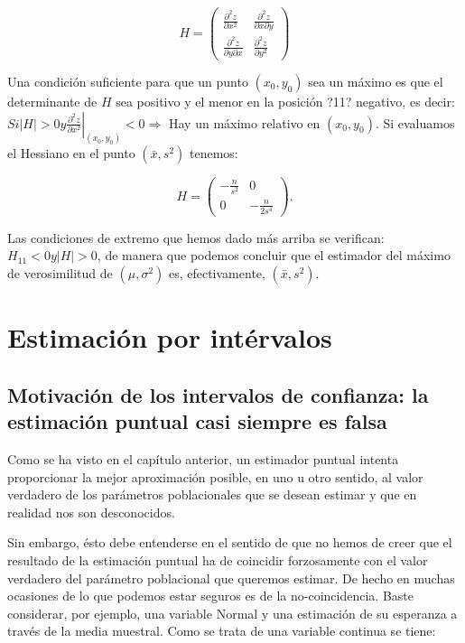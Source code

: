 \documentclass[
]{article}
\begin{document}
\[
H=\left(\begin{array}{cc}
\frac{\partial^{2} z}{\partial x^{2}} & \frac{\partial^{2} z}{\partial x \partial y} \\
\frac{\partial^{2} z}{\partial y \partial x} & \frac{\partial^{2} z}{\partial y^{2}}
\end{array}\right)
\]

Una condición suficiente para que un punto \(\left(x_{0}, y_{0}\right)\) sea un máximo es que el determinante de \(H\) sea positivo y el menor en la posición ?11? negativo, es decir:
\(S i|H|>\left.0 y \frac{\partial^{2} z}{\partial x^{2}}\right|_{\left(x_{0}, y_{0}\right)}<0 \Longrightarrow\) Hay un máximo relativo en \(\left(x_{0}, y_{0}\right)\).
Si evaluamos el Hessiano en el punto \(\left(\bar{x}, s^{2}\right)\) tenemos:

\[
H=\left(\begin{array}{cc}
-\frac{n}{s^{2}} & 0 \\
0 & -\frac{n}{2 s^{4}}
\end{array}\right) .
\]

Las condiciones de extremo que hemos dado más arriba se verifican: \(H_{11}<0 y|H|>0\), de manera que podemos concluir que el estimador del máximo de verosimilitud de \(\left(\mu, \sigma^{2}\right)\) es, efectivamente, \(\left(\bar{x}, s^{2}\right)\).

\newpage

\section{Estimación por intérvalos}\label{estimaciuxf3n-por-intuxe9rvalos}

\subsection{Motivación de los intervalos de confianza: la estimación puntual casi siempre es falsa}\label{motivaciuxf3n-de-los-intervalos-de-confianza-la-estimaciuxf3n-puntual-casi-siempre-es-falsa}

Como se ha visto en el capítulo anterior, un estimador puntual intenta proporcionar la mejor aproximación posible, en uno u otro sentido, al valor verdadero de los parámetros poblacionales que se desean estimar y que en realidad nos son desconocidos.

Sin embargo, ésto debe entenderse en el sentido de que no hemos de creer que el resultado de la estimación puntual ha de coincidir forzosamente con el valor verdadero del parámetro poblacional que queremos estimar. De hecho en muchas ocasiones de lo que podemos estar seguros es de la no-coincidencia. Baste considerar, por ejemplo, una variable Normal y una estimación de su esperanza a través de la media muestral. Como se trata de una variable continua se tiene:
\end{document}
